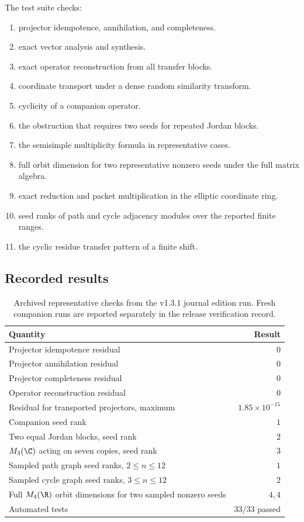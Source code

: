 The test suite checks:
\begin{enumerate}[label=(\roman*)]
\item projector idempotence, annihilation, and completeness.
\item exact vector analysis and synthesis.
\item exact operator reconstruction from all transfer blocks.
\item coordinate transport under a dense random similarity transform.
\item cyclicity of a companion operator.
\item the obstruction that requires two seeds for repeated Jordan blocks.
\item the semisimple multiplicity formula in representative cases.
\item full orbit dimension for two representative nonzero seeds under the full matrix algebra.
\item exact reduction and packet multiplication in the elliptic coordinate ring.
\item seed ranks of path and cycle adjacency modules over the reported finite ranges.
\item the cyclic residue transfer pattern of a finite shift.
\end{enumerate}

\subsection{Recorded results}

\begin{table}[htbp]
\centering
\caption{Archived representative checks from the v1.3.1 journal edition run. Fresh companion runs are reported separately in the release verification record.}
\label{tab:results}
\begin{tabular}{L{0.57\textwidth}r}
\toprule
Quantity & Result \\
\midrule
Projector idempotence residual & $0$ \\
Projector annihilation residual & $0$ \\
Projector completeness residual & $0$ \\
Operator reconstruction residual & $0$ \\
Residual for transported projectors, maximum & $1.85\times10^{-15}$ \\
Companion seed rank & $1$ \\
Two equal Jordan blocks, seed rank & $2$ \\
$M_3(\C)$ acting on seven copies, seed rank & $3$ \\
Sampled path graph seed ranks, $2\le n\le12$ & $1$ \\
Sampled cycle graph seed ranks, $3\le n\le12$ & $2$ \\
Full $M_4(\R)$ orbit dimensions for two sampled nonzero seeds & $4,4$ \\
Automated tests & $33/33$ passed \\
\bottomrule
\end{tabular}
\end{table}

